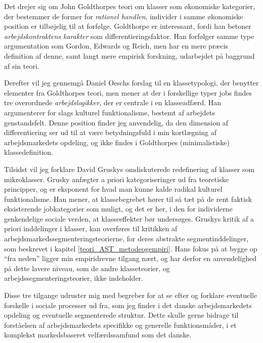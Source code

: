 Det drejer sig om John Goldthorpes teori om klasser som økonomiske kategorier, der bestemmer de former for \emph{rationel handlen}, individer i samme økonomiske position er tilbøjelig til at forfølge. Goldthorpe er interessant, fordi han betoner \emph{arbejdskontraktens karakter} som differentieringsfaktor. Han forfølger samme type argumentation som Gordon, Edwards og Reich, men har en mere præcis definition af denne, samt langt mere empirisk forskning, udarbejdet på baggrund af sin teori. 

Derefter vil jeg gennemgå Daniel Oeschs forslag til en klassetypologi, der benytter elementer fra Goldthorpes teori, men mener at der i forskellige typer jobs findes tre overordnede \emph{arbejdslogikker}, der er centrale i en klasseadfærd. Han argumenterer for slags kulturel funktionalisme, bestemt af arbejdets genstandsfelt. Denne position finder jeg anvendelig, da den dimension af differentiering ser ud til at være betydningsfuld i min kortlægning af arbejdsmarkedets opdeling, og ikke findes i Goldthorpes (minimalistiske) klassedefinition.

Tilsidst vil jeg forklare David Gruskys omdiskuterede redefinering af klasser som mikroklasser. Grusky anfægter a priori kategoriseringer ud fra teoretiske principper, og er eksponent for hvad man kunne kalde radikal kulturel funktionalisme. Han mener, at klassebegrebet hører til så tæt på de rent faktisk eksisterende jobkategorier som muligt, og det er her, i den for individerne genkendelige sociale verden, at klasseeffekter bør undersøges. Gruskys kritik af a priori inddelinger i klasser, kan overføres til kritikken af arbejdsmarkedssegmenteringsteorierne, for deres abstrakte segmentinddelinger, som beskrevet i kapitel \ref{teori_AST_metodeogempiri}. Hans fokus på at bygge op “fra neden” ligger min empiridrevne tilgang nært, og har derfor en anvendelighed på dette lavere niveau, som de andre klasseteorier, og arbejdssegmenteringsteorier, ikke indeholder. 

Disse tre tilgange udruster mig med begreber for at se efter og forklare eventuelle forskelle i sociale processer ud fra, som jeg finder i det danske arbejdsmarkedets opdeling og eventuelle segmenterede struktur. Dette skulle gerne bidrage til forståelsen af arbejdsmarkedets specifikke og generelle funktionsmåder, i et komplekst markedsbaseret velfærdssamfund som det danske. 


